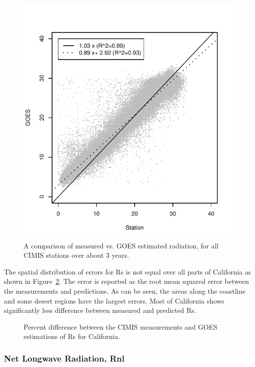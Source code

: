 \documentclass[reviewcopy]{elsart}
\begin{document}
\begin{figure}[htbp]
  \centering
  \includegraphics{Rs_R.pdf}
  \caption{ A comparison of measured vs. \ac{GOES} estimated
    radiation, for all \ac{CIMIS} stations over about 3 years.  }
  \label{fig:Rs}
\end{figure}

The spatial distribution of errors for \ac{Rs} is not equal over all
parts of California as shown in Figure~\ref{fig:errRns}.  The error is
reported as the root mean squared error between the measurements and
predictions.  As can be seen, the areas along the coastline and some
desert regions have the largest errors.  Most of California shows
significantly less difference between measured and predicted \ac{Rs}.

\begin{figure}[htbp]
  \centering
  \resizebox{0.5\textwidth}{!}{}
  \label{fig:errRns}
  \caption{
%
    Percent difference between the \ac{CIMIS}
    measurements and \ac{GOES} estimations of \ac{Rs} for California.
%
  }
\end{figure}

\subsubsection{Net Longwave Radiation, \ac{Rnl}}
\label{sec:rnl}
\end{document}
